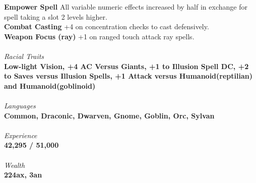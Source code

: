 \documentclass[letterpaper]{article}
\newcommand{\e}[1]{\emph{#1}}
\newcommand{\B}[1]{\textbf{#1}}
\begin{document}
\B{Empower Spell} All variable numeric effects increased by half in exchange for spell taking a slot 2 levels higher. \\
\B{Combat Casting} +4 on concentration checks to cast defensively. \\
\B{Weapon Focus (ray)} +1 on ranged touch attack ray spells. \\
\\
\e{Racial Traits} \\
\B{Low-light Vision, +4 AC Versus Giants, +1 to Illusion Spell DC, +2 to Saves versus Illusion Spells, +1 Attack versus Humanoid(reptilian) and Humanoid(goblinoid)} \\
\\
\e{Languages} \\
\B{Common, Draconic, Dwarven, Gnome, Goblin, Orc, Sylvan} \\
\\
{\e{Experience}} \\
\B{42,295 / 51,000} \\
\\
{\e{Wealth}} \\
\B{224ax, 3an}
\end{document}
